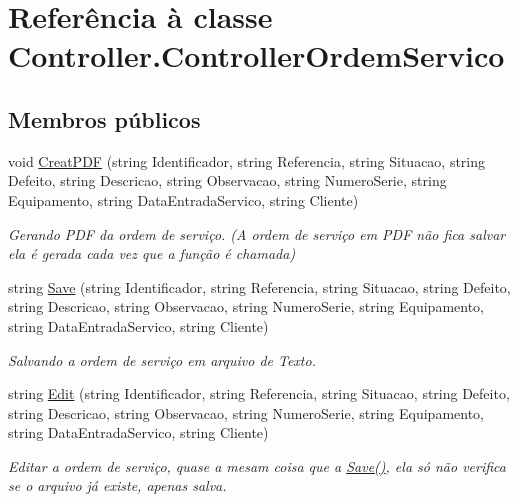 \hypertarget{class_controller_1_1_controller_ordem_servico}{}\section{Referência à classe Controller.\+Controller\+Ordem\+Servico}
\label{class_controller_1_1_controller_ordem_servico}
\subsection*{Membros públicos}
\begin{DoxyCompactItemize}
\item 
void \hyperlink{class_controller_1_1_controller_ordem_servico_a76b75426b392271af3622e757ded651e}{Creat\+P\+D\+F} (string Identificador, string Referencia, string Situacao, string Defeito, string Descricao, string Observacao, string Numero\+Serie, string Equipamento, string Data\+Entrada\+Servico, string Cliente)
\begin{DoxyCompactList}\small\item\em Gerando P\+D\+F da ordem de serviço. (A ordem de serviço em P\+D\+F não fica salvar ela é gerada cada vez que a função é chamada) \end{DoxyCompactList}\item 
string \hyperlink{class_controller_1_1_controller_ordem_servico_adfd037a51c630b9964949ee7d9055666}{Save} (string Identificador, string Referencia, string Situacao, string Defeito, string Descricao, string Observacao, string Numero\+Serie, string Equipamento, string Data\+Entrada\+Servico, string Cliente)
\begin{DoxyCompactList}\small\item\em Salvando a ordem de serviço em arquivo de Texto. \end{DoxyCompactList}\item 
string \hyperlink{class_controller_1_1_controller_ordem_servico_a885602b4f0f6b6b34b3fd8a56b992c5e}{Edit} (string Identificador, string Referencia, string Situacao, string Defeito, string Descricao, string Observacao, string Numero\+Serie, string Equipamento, string Data\+Entrada\+Servico, string Cliente)
\begin{DoxyCompactList}\small\item\em Editar a ordem de serviço, quase a mesam coisa que a \hyperlink{class_controller_1_1_controller_ordem_servico_adfd037a51c630b9964949ee7d9055666}{Save()}, ela só não verifica se o arquivo já existe, apenas salva. \end{DoxyCompactList}\item 

\end{DoxyCompactItemize}
